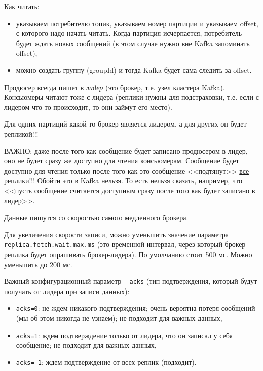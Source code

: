 \documentclass[%
	11pt,
	a4paper,
	utf8,
		]{article}
\begin{document}
Как читать:
\begin{itemize}
	\item указываем потребителю топик, указываем номер партиции и указываем offset, с которого надо начать читать. Когда партиция исчерпается, потребитель будет ждать новых сообщений (в этом случае нужно вне Kafka запоминать offset),
	
	\item можно создать группу (groupId) и тогда Kafka будет сама следить за offset.
\end{itemize}

Продюсер \underline{всегда} пишет в \emph{лидер} (это брокер, т.е. узел кластера Kafka). Консьюмеры читают тоже с лидера (реплики нужны для подстраховки, т.е. если с лидером что-то происходит, то они займут его место).

Для одних партиций какой-то брокер является лидером, а для других он будет репликой!!!

ВАЖНО: даже после того как сообщение будет записано продюсером в лидер, оно не будет сразу же доступно для чтения консьюмерам. Сообщение будет доступно для чтения только после того как это сообщение <<подтянут>> \underline{все} реплики!!! Обойти это в Kafka нельзя. То есть нельзя сказать, например, что <<пусть сообщение считается доступным сразу после того как будет записано в лидер>>.

Данные пишутся со скоростью самого медленного брокера.

Для увеличения скорости записи, можно уменьшить значение параметра \texttt{replica.fetch.wait.max.ms} (это временной интервал, через который брокер-реплика будет опрашивать брокер-лидера). По умолчанию стоит 500 мс. Можно уменьшить до 200 мс.

Важный конфигурационный параметр -- \texttt{acks} (тип подтверждения, который будут получать от лидера при записи данных):
\begin{itemize}
	\item \texttt{acks=0}: не ждем никакого подтверждения; очень вероятна потеря сообщений (мы об этом никогда не узнаем); не подходит для важных данных,
	
	\item \texttt{acks=1}: ждем подтверждение только от лидера, что он записал у себя сообщение; не подходит для важных данных,
	
	\item \texttt{acks=-1}: ждем подтверждение от всех реплик (подходит). 
\end{itemize}
\end{document}
